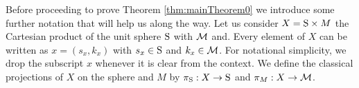

Before proceeding to prove Theorem \ref{thm:mainTheorem0} we introduce some further notation that will help us along the way. Let us consider $X = \text{S} \times M$ the Cartesian product of the unit sphere $\text{S}$ with $\mathcal{M}$ and. Every element of $X$ can be written as $x = (s_x, k_x)$ with $s_x \in \text{S}$ and $k_x \in \mathcal{M}$. For notational simplicity, we drop the subscript $x$ whenever it is clear from the context. We define the classical projections of $X$ on the sphere and $M$ by $\pi_{\text{S}}: X \to \text{S}$ and $\pi_M: X \to \mathcal{M}$.

